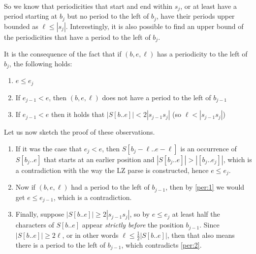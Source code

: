 So we know that periodicities that start and end within $s_j$, or at least have a period starting at $b_j$ but no period to the left of $b_j$, have their periods upper bounded as $\ell \leq |s_j|$.
Interestingly, it is also possible to find an upper bound of the periodicities that have a period to the left of $b_j$.

It is the consequence of the fact that if $(b,e,\ell)$ has a periodicity to the left of $b_j$, the following holds:
\begin{enumerate}
    \item $e \leq e_j$ \label{per:1}
    \item If $e_{j-1} < e$, then $(b,e,\ell)$ does not have a period to the left of $b_{j-1}$ \label{per:2}
    \item If $e_{j-1} < e$ then it holds that $|S[b..e]| < 2|s_{j-1}s_{j}|$ (so $\ell < |s_{j-1}s_{j}|$) \label{per:3}
\end{enumerate}

Let us now sketch the proof of these observations.
\begin{enumerate}
    \item 
    If it was the case that $e_j < e$, then $S[b_j - \ell .. e-\ell]$ is an occurrence of $S[b_j .. e]$ that starts at an earlier position and $|S[b_j .. e]| > |[b_j .. e_j]|$, which is a contradiction with the way the LZ parse is constructed, hence $e \leq e_j$.
    \item
    Now if $(b,e,\ell)$ had a period to the left of $b_{j-1}$, then by \ref{per:1} we would get $e \leq e_{j-1}$, which is a contradiction.
    \item
    Finally, suppose $|S[b..e]| \geq 2|s_{j-1}s_{j}|$, so by $e \leq e_j$ at least half the characters of $S[b..e]$ appear \textit{strictly before} the position $b_{j-1}$.
    Since $|S[b..e]| \geq 2\ell$, or in other words $\ell \leq \frac{1}{2} |S[b..e]|$, then that also means there is a period to the left of $b_{j-1}$, which contradicts \ref{per:2}.
\end{enumerate}

